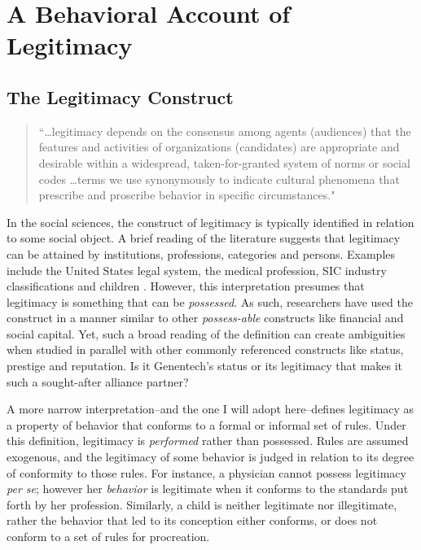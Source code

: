\documentclass[12pt]{article}
\begin{document}
\section{A Behavioral Account of Legitimacy}
\label{ch:prop}
\subsection{The Legitimacy Construct}
\begin{small}
\begin{quote}
``\ldots legitimacy depends on the consensus among agents (audiences) that the features and activities of organizations (candidates) are appropriate and desirable within a widespread, taken-for-granted system of norms or social codes \ldots terms we use synonymously to indicate cultural phenomena that prescribe and proscribe behavior in specific circumstances." \cite[p. ~146]{825}
\end{quote} 
\end{small}

In the social sciences, the construct of legitimacy is typically identified in relation to some social object. A brief reading of the literature suggests that legitimacy can be attained by institutions, professions, categories and persons. Examples include the United States legal system, the medical profession, SIC industry classifications and children \cite{493, 890, 891, 885}. However, this interpretation presumes that legitimacy is something that can be \emph{possessed}. As such, researchers have used the construct in a manner similar to other \emph{possess-able} constructs like financial and social capital. Yet, such a broad reading of the definition can create ambiguities when studied in parallel with other commonly referenced constructs like status, prestige and reputation. Is it Genentech's status or its legitimacy that makes it such a sought-after alliance partner? 

A more narrow interpretation--and the one I will adopt here--defines legitimacy as a property of behavior that conforms to a formal or informal set of rules. Under this definition, legitimacy is \emph{performed} rather than possessed. Rules are assumed exogenous, and the legitimacy of some behavior is judged in relation to its degree of conformity to those rules. For instance, a physician cannot possess legitimacy \emph{per se}; however her \emph{behavior} is legitimate when it conforms to the standards put forth by her profession. Similarly, a child is neither legitimate nor illegitimate, rather the behavior that led to its conception either conforms, or does not conform to a set of rules for procreation. 
\end{document}
